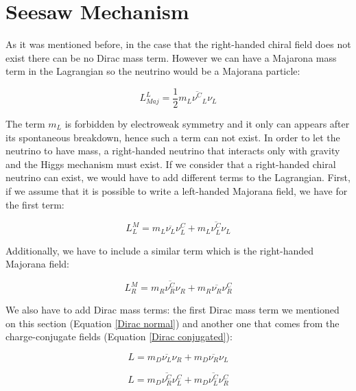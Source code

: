 


\section{Seesaw Mechanism}

As it was mentioned before, in the case that the right-handed chiral field does not exist there can be no Dirac mass term. However we can have a Majarona mass term in the 
Lagrangian so the neutrino would be a Majorana particle:

\begin{equation}
L_{Maj}^{L} = \frac{1}{2} m_L \overline{\nu^{C}}_L \nu_L
\end{equation}

The term $m_L$ is forbidden by electroweak symmetry and it only can appears after its spontaneous breakdown, hence such a term can not exist. In order to let the neutrino to have mass, a right-handed neutrino that interacts only with gravity and the Higgs mechanism must exist.
If we consider that a right-handed chiral neutrino can exist, we would have to add different terms to the Lagrangian. First, if 
we assume that it is possible to write a left-handed Majorana field, we have for the first term:

\begin{equation}
L_L^{M} = m_L \overline{\nu_L} \nu_{L}^C + m_L \overline{\nu_L^C} \nu_L
\end{equation}

Additionally, we have to include a similar term which is the right-handed Majorana field:

\begin{equation}
L_R^{M} = m_R \overline{\nu_R^C} \nu_{R} + m_R \overline{\nu_R} \nu_R^C
\end{equation}

We also have to add Dirac mass terms: the first Dirac mass term we mentioned on this section (Equation \ref{Dirac normal}) and another one that comes from the 
charge-conjugate fields (Equation \ref{Dirac conjugated}):

\begin{equation}\label{Dirac normal}
L = m_D \overline{\nu_L}\nu_R + m_D \overline{\nu_R}\nu_L
\end{equation} 

\begin{equation}\label{Dirac conjugated}
L = m_D \overline{\nu_R^C} \nu_L^C + m_D \overline{\nu_L^C}\nu_R^C
\end{equation} 

